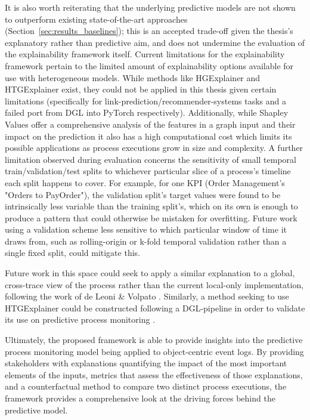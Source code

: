 It is also worth reiterating that the underlying predictive models are not shown to outperform existing state-of-the-art approaches (Section~\ref{sec:results_baselines}); this is an accepted trade-off given the thesis's explanatory rather than predictive aim, and does not undermine the evaluation of the explainability framework itself. Current limitations for the explainability framework pertain to the limited amount of explainability options available for use with heterogeneous models. While methods like HGExplainer and HTGExplainer exist, they could not be applied in this thesis given certain limitations (specifically for link-prediction/recommender-systems tasks and a failed port from DGL into PyTorch respectively). Additionally, while Shapley Values offer a comprehensive analysis of the features in a graph input and their impact on the prediction it also has a high computational cost which limits its possible applications as process executions grow in size and complexity. A further limitation observed during evaluation concerns the sensitivity of small temporal train/validation/test splits to whichever particular slice of a process's timeline each split happens to cover. For example, for one KPI (Order Management's "Orders to PayOrder"), the validation split's target values were found to be intrinsically less variable than the training split's, which on its own is enough to produce a pattern that could otherwise be mistaken for overfitting. Future work using a validation scheme less sensitive to which particular window of time it draws from, such as rolling-origin or k-fold temporal validation rather than a single fixed split, could mitigate this.


Future work in this space could seek to apply a similar explanation to a global, cross-trace view of the process rather than the current local-only implementation, following the work of de Leoni \& Volpato \cite{deleonieVolpato}. Similarly, a method seeking to use HTGExplainer could be constructed following a DGL-pipeline in order to validate its use on predictive process monitoring \cite{li2023}.


Ultimately, the proposed framework is able to provide insights into the predictive process monitoring model being applied to object-centric event logs. By providing stakeholders with explanations quantifying the impact of the most important elements of the inputs, metrics that assess the effectiveness of those explanations, and a counterfactual method to compare two distinct process executions, the framework provides a comprehensive look at the driving forces behind the predictive model.